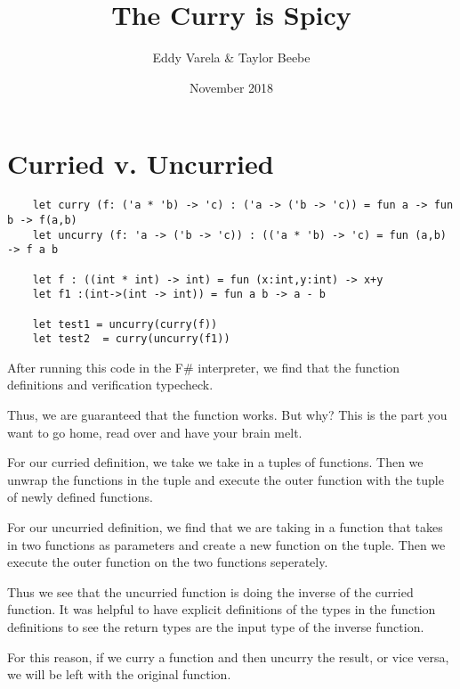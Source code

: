 \documentclass{article}
\title{The Curry is Spicy}
\author{Eddy Varela \& Taylor Beebe}
\date{November 2018}
\begin{document}
\maketitle

\section{Curried v. Uncurried}
\begin{verbatim}
    let curry (f: ('a * 'b) -> 'c) : ('a -> ('b -> 'c)) = fun a -> fun b -> f(a,b)
    let uncurry (f: 'a -> ('b -> 'c)) : (('a * 'b) -> 'c) = fun (a,b) -> f a b

    let f : ((int * int) -> int) = fun (x:int,y:int) -> x+y
    let f1 :(int->(int -> int)) = fun a b -> a - b

    let test1 = uncurry(curry(f))
    let test2  = curry(uncurry(f1))
\end{verbatim}

After running this code in the F\# interpreter, we find that the function definitions and verification typecheck.

Thus, we are guaranteed that the function works. But why? This is the part you want to go home, read over and have your brain melt.\newline

For our curried definition, we take we take in a tuples of functions. Then we unwrap the functions in the tuple and execute the outer function with the tuple of newly defined functions. 

For our uncurried definition, we find that we are taking in a function that takes in two functions as parameters and create a new function on the tuple. Then we execute the outer function on the two functions seperately.\newline{}

Thus we see that the uncurried function is doing the inverse of the curried function. It was helpful to have explicit definitions of the types in the function definitions to see the return types are the input type of the inverse function.\newline{}

For this reason, if we curry a function and then uncurry the result, or vice versa, we will be left with the original function.
\end{document}
